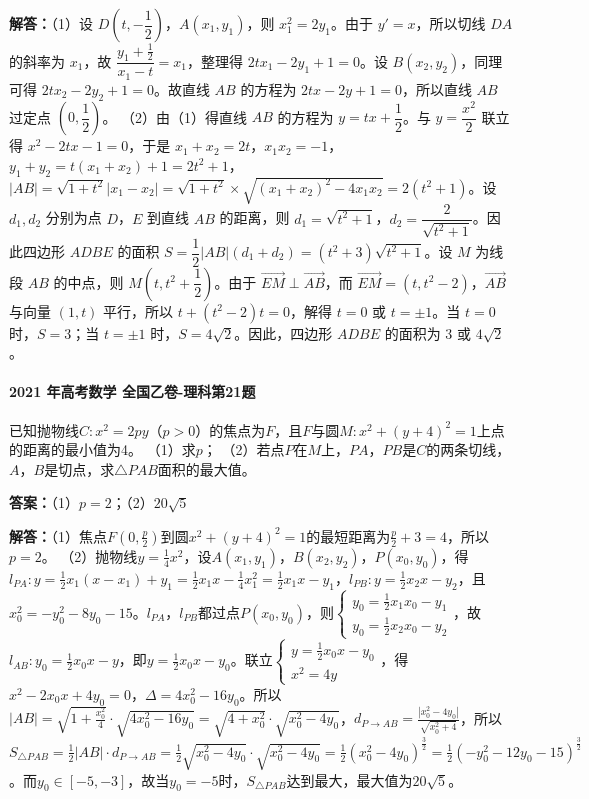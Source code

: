 \documentclass[UTF8,a4paper,11pt]{ctexart}
\begin{document}
\textbf{解答：}（1）设 $D\left(t,-\dfrac{1}{2}\right)$，$A(x_1,y_1)$，则 $x_1^2=2y_1$。由于 $y'=x$，所以切线 $DA$ 的斜率为 $x_1$，故 $\dfrac{y_1+\frac{1}{2}}{x_1-t}=x_1$，整理得 $2tx_1-2y_1+1=0$。设 $B(x_2,y_2)$，同理可得 $2tx_2-2y_2+1=0$。故直线 $AB$ 的方程为 $2tx-2y+1=0$，所以直线 $AB$ 过定点 $\left(0,\dfrac{1}{2}\right)$。
（2）由（1）得直线 $AB$ 的方程为 $y=tx+\dfrac{1}{2}$。与 $y=\dfrac{x^2}{2}$ 联立得 $x^2-2tx-1=0$，于是 $x_1+x_2=2t$，$x_1x_2=-1$，$y_1+y_2=t(x_1+x_2)+1=2t^2+1$，$|AB|=\sqrt{1+t^2}|x_1-x_2|=\sqrt{1+t^2}\times\sqrt{(x_1+x_2)^2-4x_1x_2}=2(t^2+1)$。设 $d_1,d_2$ 分别为点 $D$，$E$ 到直线 $AB$ 的距离，则 $d_1=\sqrt{t^2+1}$，$d_2=\dfrac{2}{\sqrt{t^2+1}}$。因此四边形 $ADBE$ 的面积 $S=\dfrac{1}{2}|AB|(d_1+d_2)=(t^2+3)\sqrt{t^2+1}$。设 $M$ 为线段 $AB$ 的中点，则 $M\left(t,t^2+\dfrac{1}{2}\right)$。由于 $\overrightarrow{EM}\perp\overrightarrow{AB}$，而 $\overrightarrow{EM}=(t,t^2-2)$，$\overrightarrow{AB}$ 与向量 $(1,t)$ 平行，所以 $t+(t^2-2)t=0$，解得 $t=0$ 或 $t=\pm1$。当 $t=0$ 时，$S=3$；当 $t=\pm1$ 时，$S=4\sqrt{2}$。因此，四边形 $ADBE$ 的面积为 $3$ 或 $4\sqrt{2}$。

\paragraph{2021 年高考数学 全国乙卷-理科第21题}

已知抛物线$C:x^2=2py$（$p>0$）的焦点为$F$，且$F$与圆$M:x^2+(y+4)^2=1$上点的距离的最小值为4。
（1）求$p$；
（2）若点$P$在$M$上，$PA$，$PB$是$C$的两条切线，$A$，$B$是切点，求$\triangle PAB$面积的最大值。

\textbf{答案：}（1）$p=2$；（2）$20\sqrt{5}$\par

\textbf{解答：}（1）焦点$F(0,\frac{p}{2})$到圆$x^2+(y+4)^2=1$的最短距离为$\frac{p}{2}+3=4$，所以$p=2$。
（2）抛物线$y=\frac14x^2$，设$A(x_1,y_1)$，$B(x_2,y_2)$，$P(x_0,y_0)$，得$l_{PA}: y=\frac12x_1(x-x_1)+y_1=\frac12x_1x-\frac14x_1^2=\frac12x_1x-y_1$，$l_{PB}: y=\frac12x_2x-y_2$，且$x_0^2=-y_0^2-8y_0-15$。$l_{PA}$，$l_{PB}$都过点$P(x_0,y_0)$，则$\begin{cases} y_0=\frac12x_1x_0-y_1 \\ y_0=\frac12x_2x_0-y_2 \end{cases}$，故$l_{AB}: y_0=\frac12x_0x-y$，即$y=\frac12x_0x-y_0$。联立$\begin{cases} y=\frac12x_0x-y_0 \\ x^2=4y \end{cases}$，得$x^2-2x_0x+4y_0=0$，$\Delta=4x_0^2-16y_0$。所以$|AB|=\sqrt{1+\frac{x_0^2}{4}}\cdot\sqrt{4x_0^2-16y_0}=\sqrt{4+x_0^2}\cdot\sqrt{x_0^2-4y_0}$，$d_{P\to AB}=\frac{|x_0^2-4y_0|}{\sqrt{x_0^2+4}}$，所以$S_{\triangle PAB}=\frac12|AB|\cdot d_{P\to AB}=\frac12\sqrt{x_0^2-4y_0}\cdot\sqrt{x_0^2-4y_0}=\frac12(x_0^2-4y_0)^{\frac32}=\frac12(-y_0^2-12y_0-15)^{\frac32}$。而$y_0\in[-5,-3]$，故当$y_0=-5$时，$S_{\triangle PAB}$达到最大，最大值为$20\sqrt{5}$。
\end{document}
